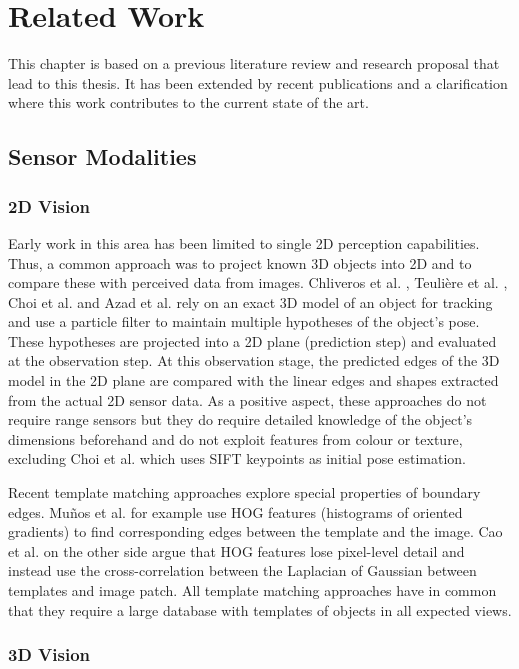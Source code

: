 \chapter{Related Work}
\label{sec:related_work}

This chapter is based on a previous literature review and research proposal that lead to this thesis. It has been extended by recent publications and a clarification where this work contributes to the current state of the art.


\section{Sensor Modalities}

\subsection{2D Vision}
Early work in this area has been limited to single 2D perception capabilities. Thus, a common approach was to project known 3D objects into 2D and to compare these with perceived data from images. Chliveros et al. \cite{Chliveros2013}, Teuli\`ere et al. \cite{Teuliere2010}, Choi et al. \cite{Choi2012} and Azad et al. \cite{Azad2011} rely on an exact 3D model of an object for tracking and use a particle filter to maintain multiple hypotheses of the object's pose. These hypotheses are projected into a 2D plane (prediction step) and evaluated at the observation step. At this observation stage, the predicted edges of the 3D model in the 2D plane are compared with the linear edges and shapes extracted from the actual 2D sensor data. As a positive aspect, these approaches do not require range sensors but they do require detailed knowledge of the object's dimensions beforehand and do not exploit features from colour or texture, excluding Choi et al. which uses SIFT keypoints as initial pose estimation.

Recent template matching approaches explore special properties of boundary edges. Mu\~nos et al. \cite{Munoz2016} for example use HOG features (histograms of oriented gradients) to find corresponding edges between the template and the image. Cao et al. \cite{Cao2016} on the other side argue that HOG features lose pixel-level detail and instead use the cross-correlation between the Laplacian of Gaussian between templates and image patch. All template matching approaches have in common that they require a large database with templates of objects in all expected views.

\subsection{3D Vision}
\label{sec:3d_vision}

